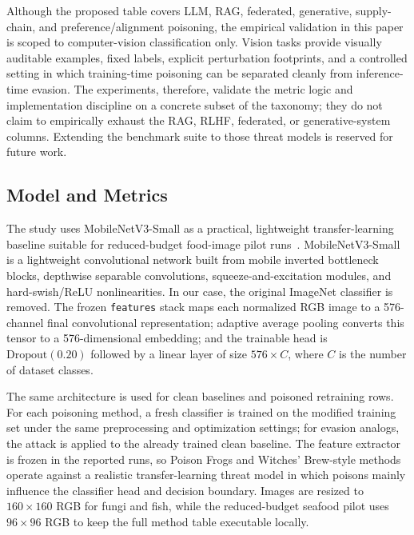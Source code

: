 \documentclass[conference]{IEEEtran}
\begin{document}
Although the proposed table covers LLM, RAG, federated, generative, supply-chain, and preference/alignment poisoning, the empirical validation in this paper is scoped to computer-vision classification only.  Vision tasks provide visually auditable examples, fixed labels, explicit perturbation footprints, and a controlled setting in which training-time poisoning can be separated cleanly from inference-time evasion. The experiments, therefore, validate the metric logic and implementation discipline on a concrete subset of the taxonomy; they do not claim to empirically exhaust the RAG, RLHF, federated, or generative-system columns. Extending the benchmark suite to those threat models is reserved for future work.


\subsection{Model and Metrics}
 The study uses MobileNetV3-Small as a practical, lightweight transfer-learning baseline suitable for reduced-budget food-image pilot runs~\cite{mobilenetv3}. MobileNetV3-Small is a lightweight convolutional network built from mobile inverted bottleneck blocks, depthwise separable convolutions, squeeze-and-excitation modules, and hard-swish/ReLU nonlinearities. In our case, the original ImageNet classifier is removed. The frozen \texttt{features} stack maps each normalized RGB image to a 576-channel final convolutional representation; adaptive average pooling converts this tensor to a 576-dimensional embedding; and the trainable head is \(\mathrm{Dropout}(0.20)\) followed by a linear layer of size \(576\times C\), where \(C\) is the number of dataset classes.

The same architecture is used for clean baselines and poisoned retraining rows. For each poisoning method, a fresh classifier is trained on the modified training set under the same preprocessing and optimization settings; for evasion analogs, the attack is applied to the already trained clean baseline. The feature extractor is frozen in the reported runs, so Poison Frogs and Witches' Brew-style methods operate against a realistic transfer-learning threat model in which poisons mainly influence the classifier head and decision boundary. Images are resized to \(160\times160\) RGB for fungi and fish, while the reduced-budget seafood pilot uses \(96\times96\) RGB to keep the full method table executable locally.
\end{document}
